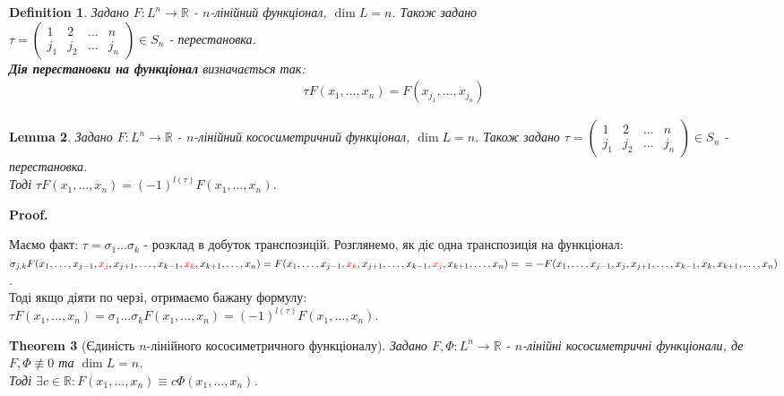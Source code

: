\documentclass[a4paper, 10pt]{article}
\makeatletter
\theoremstyle{theoremdd}
\newtheorem{theorem}{Theorem}[subsection]
\newtheorem{definition}[theorem]{Definition}
\newtheorem{lemma}[theorem]{Lemma}
\renewenvironment{proof}[1][Proof.\\]{\par
\pushQED{\hfill \qed}%
\normalfont \topsep6\p@\@plus6\p@\relax
\trivlist
\item\relax
{\bfseries
#1\@addpunct{.}}\hspace\labelsep\ignorespaces
}{%
\popQED\endtrivlist\@endpefalse
}
\makeatother
\begin{document}
	\begin{definition}
	Задано $F: L^n \to \mathbb{R}$ - $n$-лінійний функціонал, $\dim L = n$. Також задано \\ $\tau = \begin{pmatrix} 1 & 2 & \dots & n \\
	j_1 & j_2 & \dots & j_n
\end{pmatrix}	 \in S_n$ - перестановка.\\
\textbf{Дія перестановки на функціонал} визначається так:
\begin{align*}
\tau F(x_1,\dots,x_n) = F(x_{j_1},\dots,x_{j_n})
\end{align*}
	\end{definition}
	
	\begin{lemma}
	\label{permutation_functional}
	Задано $F: L^n \to \mathbb{R}$ - $n$-лінійний кососиметричний функціонал, $\dim L = n$. Також задано $\tau = \begin{pmatrix} 1 & 2 & \dots & n \\
	j_1 & j_2 & \dots & j_n
\end{pmatrix}	 \in S_n$ - перестановка.\\
Тоді $\tau F(x_1,\dots, x_n) = (-1)^{l(\tau)}F(x_1,\dots,x_n)$.
	\end{lemma}
	
	\begin{proof}
	Маємо факт: $\tau = \sigma_1 \dots \sigma_k$ - розклад в добуток транспозицій. Розглянемо, як діє одна транспозиція на функціонал:\\
$\sigma_{j,k}F(x_1,\dots,x_{j-1},\textcolor{red}{x_j},x_{j+1},\dots,x_{k-1},\textcolor{red}{x_k},x_{k+1},\dots,x_n) = F(x_1,\dots,x_{j-1},\textcolor{red}{x_k},x_{j+1},\dots,x_{k-1},\textcolor{red}{x_j},x_{k+1},\dots,x_n) = \\ = -F(x_1,\dots,x_{j-1},x_j,x_{j+1},\dots,x_{k-1},x_k,x_{k+1},\dots,x_n)$.\\
Тоді якщо діяти по черзі, отримаємо бажану формулу:\\
$\tau F(x_1,\dots,x_n) = \sigma_1 \dots \sigma_k F(x_1,\dots,x_n) = (-1)^{l(\tau)}F(x_1,\dots,x_n)$.
\end{proof}

\begin{theorem}[Єдиність $n$-лінійного кососиметричного функціоналу]
Задано $F,\Phi: L^n \to \mathbb{R}$ - $n$-лінійні кососиметричні функціонали, де $F, \Phi \not\equiv 0$ та $\dim L = n$.\\
Тоді $\exists c \in \mathbb{R}: F(x_1,\dots,x_n) \equiv c\Phi(x_1,\dots,x_n)$.
\end{theorem}
\end{document}
